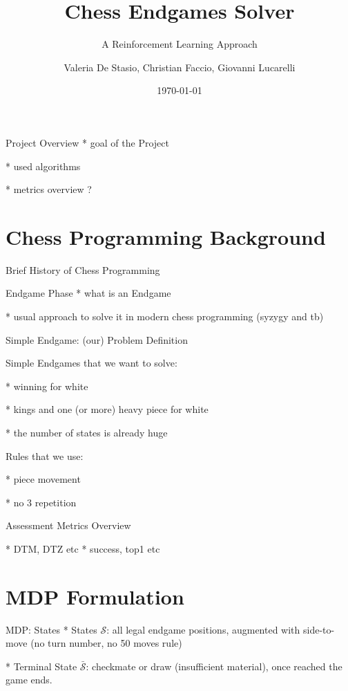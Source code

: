 \documentclass[12pt]{beamer}
\title{Chess Endgames Solver}
\subtitle{A Reinforcement Learning Approach}
\date{\today}
\author[longname]{Valeria De Stasio, Christian Faccio, Giovanni Lucarelli}
\begin{document}
\maketitle

\begin{frame}{Project Overview}
  * goal of the Project

  * used algorithms
  
  * metrics overview ?
\end{frame}

\section{Chess Programming Background}
\begin{frame}{Brief History of Chess Programming}
  
\end{frame}

\begin{frame}{Endgame Phase}
  * what is an Endgame

  * usual approach to solve it in modern chess programming (syzygy and tb)

\end{frame}

\begin{frame}{Simple Endgame: (our) Problem Definition}
  
  Simple Endgames that we want to solve:

  * winning for white

  * kings and one (or more) heavy piece for white

  * the number of states is already huge
  
  Rules that we use:

  * piece movement

  * no 3 repetition

\end{frame}

\begin{frame}{Assessment Metrics Overview}

  * DTM, DTZ etc
  * success, top1 etc
  
\end{frame}

\section{MDP Formulation}

\begin{frame}{MDP: States}
  * States $\mathcal{S}$: all legal endgame positions, augmented with side-to-move (no turn number, no 50 moves rule)
  
  * Terminal State $\bar{\mathcal{S}}$: checkmate or draw (insufficient material), once reached the game ends.
  
\end{frame}
\end{document}

